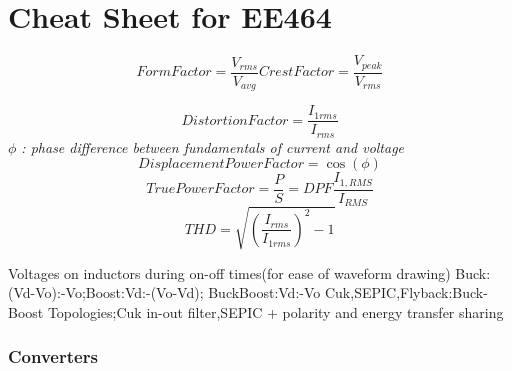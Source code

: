 \documentclass[twocolumn, ]{article}
\begin{document}
\section*{\small Cheat Sheet for EE464}
\small \begin{equation*}
Form Factor=\frac{V_{rms}}{V_{avg}}
Crest Factor=\frac{V_{peak}}{V_{rms}}
\end{equation*}

\begin{equation*}
Distortion Factor=\frac{I_{1rms}}{I_{rms}}
\end{equation*}
\textit{$\phi$ : phase difference between fundamentals of current and voltage}
\begin{equation*}
Displacement Power Factor=\cos(\phi)
\end{equation*}
\begin{equation*}
True Power Factor=\frac{P}{S}=DPF \frac{I_{1,RMS}}{I_{RMS}}
\end{equation*}
\begin{equation*}
THD=\sqrt{(\frac{I_{rms}}{I_{1rms}})^2-1}
\end{equation*}

Voltages on inductors during on-off times(for ease of waveform drawing) Buck:(Vd-Vo):-Vo;Boost:Vd:-(Vo-Vd); BuckBoost:Vd:-Vo
{Cuk,SEPIC,Flyback:Buck-Boost Topologies;Cuk in-out filter,SEPIC + polarity and energy transfer sharing}



\subsubsection*{Converters}
\end{document}
